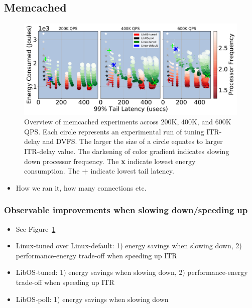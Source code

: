 \subsection{Memcached}
\label{sec:mcd}

\begin{figure}
\centering
\includegraphics[width=1\textwidth]{figures/mcd_overview}
\caption[]
{Overview of memcached experiments across 200K, 400K, and 600K QPS. Each circle represents an experimental run of tuning ITR-delay and DVFS. The larger the size of a circle equates to larger ITR-delay value. The darkening of color gradient indicates slowing down processor frequency. The \textbf{x} indicate lowest energy consumption. The \textbf{+} indicate lowest tail latency.}
\label{fig:mcd_overview}
\end{figure}

\begin{itemize}
    \item How we ran it, how many connections etc.
\end{itemize}

\subsubsection{Observable improvements when slowing down/speeding up}
\begin{itemize}
    \item See Figure~\ref{fig:mcd_overview}
    \item Linux-tuned over Linux-default: 1) energy savings when slowing down, 2) performance-energy trade-off when speeding up ITR
    \item LibOS-tuned: 1) energy savings when slowing down, 2) performance-energy trade-off when speeding up ITR
    \item LibOS-poll: 1) energy savings when slowing down
\end{itemize}

